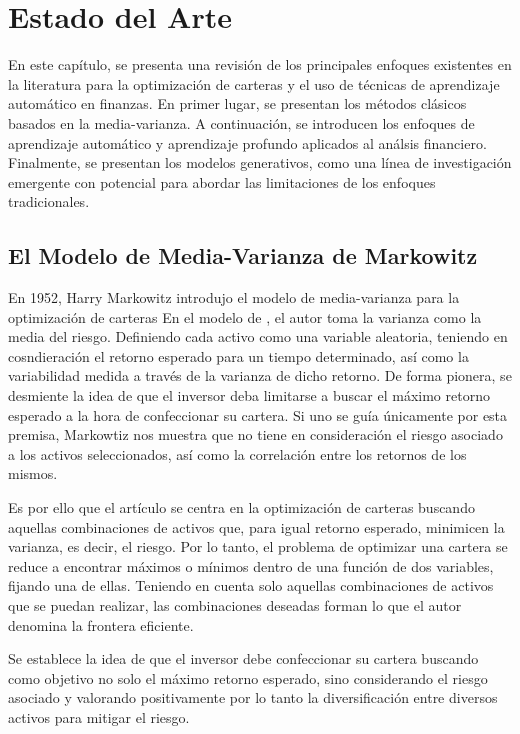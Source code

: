 \chapter{Estado del Arte}

En este capítulo, se presenta una revisión de los principales enfoques existentes en la literatura para la optimización de carteras y el uso de técnicas de aprendizaje automático en finanzas. En primer lugar, se presentan los métodos clásicos basados en la media-varianza. A continuación, se introducen los enfoques de aprendizaje automático y aprendizaje profundo aplicados al análsis financiero. Finalmente, se presentan los modelos generativos, como una línea de investigación emergente con potencial para abordar las limitaciones de los enfoques tradicionales.


\section{El Modelo de Media-Varianza de Markowitz}

En 1952, Harry Markowitz introdujo el modelo de media-varianza para la optimización de carteras En el modelo de \cite{markowitz1952}, el autor toma la varianza como la media del riesgo. Definiendo cada activo como una variable aleatoria, teniendo en cosndieración el retorno esperado para un tiempo determinado, así como la variabilidad medida a través de la varianza de dicho retorno. De forma pionera, se desmiente la idea de que el inversor deba limitarse a buscar el máximo retorno esperado a la hora de confeccionar su cartera. Si uno se guía únicamente por esta premisa, Markowtiz nos muestra que no tiene en consideración el riesgo asociado a los activos seleccionados, así como la correlación entre los retornos de los mismos. 

Es por ello que el artículo se centra en la optimización de carteras buscando aquellas combinaciones de activos que, para igual retorno esperado, minimicen la varianza, es decir, el riesgo. Por lo tanto, el problema de optimizar una cartera se reduce a encontrar máximos o mínimos dentro de una función de dos variables, fijando una de ellas. Teniendo en cuenta solo aquellas combinaciones de activos que se puedan realizar, las combinaciones deseadas forman lo que el autor denomina la frontera eficiente.

Se establece la idea de que el inversor debe confeccionar su cartera buscando como objetivo no solo el máximo retorno esperado, sino considerando el riesgo asociado y valorando positivamente por lo tanto la diversificación entre diversos activos para mitigar el riesgo.

